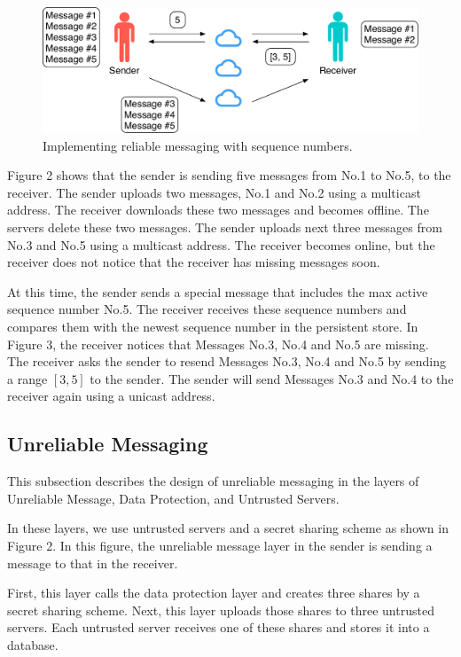\documentclass[twocolumn,10pt]{article}
\begin{document}
\begin{figure}[t]
	\centering
	\includegraphics[scale=0.38]{reliable_sync}
	\caption{Implementing reliable messaging with sequence numbers.}
\end{figure}

Figure 2 shows that the sender is sending five messages from No.1 to No.5, to the receiver.
The sender uploads two messages, No.1 and No.2 using a multicast address.
The receiver downloads these two messages and becomes offline.
The servers delete these two messages.
The sender uploads next three messages from No.3 and No.5  using a multicast address.
The receiver becomes online, but the receiver does not notice that the receiver has missing messages soon.

At this time, the sender sends a special message that includes the max active sequence number No.5.
The receiver receives these sequence numbers and compares them with the newest sequence number in the persistent store.
In Figure 3, the receiver notices that Messages No.3, No.4 and No.5 are missing.
The receiver asks the sender to resend Messages No.3, No.4 and No.5 by sending a range $[3, 5]$ to the sender.
The sender will send Messages No.3 and No.4 to the receiver again using a unicast address.

\subsection{Unreliable Messaging}

This subsection describes the design of unreliable messaging in the layers of Unreliable Message, Data Protection, and Untrusted Servers.

In these layers, we use untrusted servers and a secret sharing scheme as shown in Figure 2.
In this figure, the unreliable message layer in the sender is sending a message to that in the receiver.

First, this layer calls the data protection layer and creates three shares by a secret sharing scheme.
Next, this layer uploads those shares to three untrusted servers.
Each untrusted server receives one of these shares and stores it into a database.
\end{document}
